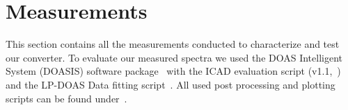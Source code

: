 \section{Measurements}
\label{sec:measurements}

This section contains all the measurements conducted to characterize
and test our converter. To evaluate our measured spectra we used the
DOAS Intelligent System (DOASIS) software package~\cite{doasis} with
the ICAD evaluation script (v1.1,~\cite{martin}) and the LP-DOAS
Data fitting script~\cite{denis}. All used post processing and
plotting scripts can be found under~\cite{scripts}.

